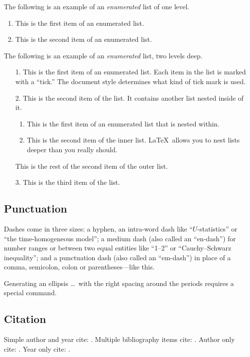 \documentclass[bj,authoryear]{imsart}
\theoremstyle{plain}
\theoremstyle{definition}
\begin{document}
The following is an example of an \emph{enumerated} list of one level.

\begin{enumerate}
\item This is the first item of an enumerated list.
\item This is the second item of an enumerated list.
\end{enumerate}

The following is an example of an \emph{enumerated} list, two levels deep.
\begin{enumerate}
\item[1.]
This is the first item of an enumerated list.  Each item
in the list is marked with a ``tick.''  The document
style determines what kind of tick mark is used.
\item[2.]
This is the second item of the list.  It contains another
list nested inside of it.
\begin{enumerate}
\item
This is the first item of an enumerated list that
is nested within.
\item
This is the second item of the inner list.  \LaTeX\
allows you to nest lists deeper than you really should.
\end{enumerate}
This is the rest of the second item of the outer list.
\item[3.]
This is the third item of the list.
\end{enumerate}

\subsection{Punctuation}
Dashes come in three sizes: a hyphen, an intra-word dash like ``$U$-statistics'' or ``the time-homogeneous model'';
a medium dash (also called an ``en-dash'') for number ranges or between two equal entities like ``1--2'' or ``Cauchy--Schwarz inequality'';
and a punctuation dash (also called an ``em-dash'') in place of a comma, semicolon,
colon or parentheses---like this.

Generating an ellipsis \ldots\ with the right spacing
around the periods requires a special command.

\subsection{Citation}

Simple author and year cite: \cite{r1}.
Multiple bibliography items cite: \cite{r1,r2}.
Author only cite: \citeauthor{r3}.
Year only cite: \citeyear{r4}.
\end{document}
